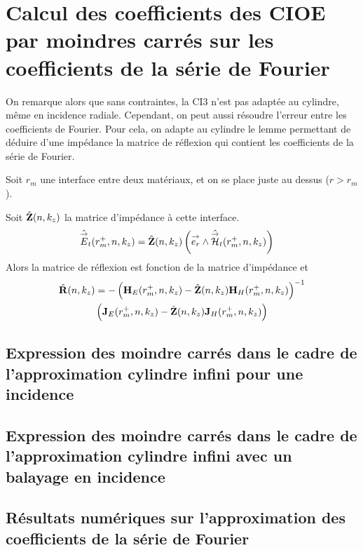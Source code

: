 \section{Calcul des coefficients des CIOE par moindres carrés sur les coefficients de la série de Fourier}

    On remarque alors que sans contraintes, la CI3 n'est pas adaptée au cylindre, même en incidence radiale. Cependant, on peut aussi résoudre l'erreur entre les coefficients de Fourier. Pour cela, on adapte au cylindre le lemme permettant de déduire d'une impédance la matrice de réflexion qui contient les coefficients de la série de Fourier.

    \begin{lemme}
        \label{lem:cylindre:reflexion_from_impedance}
        Soit \(r_m\) une interface entre deux matériaux, et on se place juste au dessus (\(r>r_m\)). 

        Soit \(\hat{\mathbf{Z}}(n,k_z)\) la matrice d'impédance à cette interface.
        \begin{align*}
            \hat{{\overset{\rightarrow}{E}}}_t(r_m^+,n,k_z) &= \hat{\mathbf{Z}}(n,k_z) \left({\overset{\rightarrow}{e_r}} \wedge \hat{{\overset{\rightarrow}{\mathcal{H}}}}_t(r_m^+,n,k_z)\right)
        \end{align*}
        Alors la matrice de réflexion est fonction de la matrice d'impédance et
        \begin{multline*}
                \hat{\mathbf{R}}(n,k_z) = - \left(\mathbf{H}_E(r_m^+,n,k_z) - \hat{\mathbf{Z}}(n,k_z) \mathbf{H}_H(r_m^+,n,k_z) \right)^{-1}\\
                \left(\mathbf{J}_E(r_m^+,n,k_z) - \hat{\mathbf{Z}}(n,k_z) \mathbf{J}_H(r_m^+,n,k_z) \right)
        \end{multline*}
    \end{lemme}

    \subsection{Expression des moindre carrés dans le cadre de l'approximation cylindre infini pour une incidence}

    \subsection{Expression des moindre carrés dans le cadre de l'approximation cylindre infini avec un balayage en incidence}

    \subsection{Résultats numériques sur l'approximation des coefficients de la série de Fourier}
